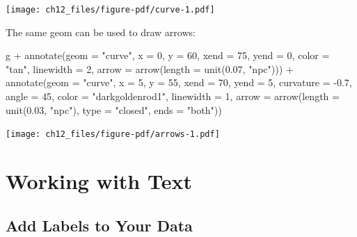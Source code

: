 \documentclass[
  letterpaper,
]{scrbook}
\newenvironment{Shaded}{\begin{snugshade}}{\end{snugshade}}
\newcommand{\AttributeTok}[1]{\textcolor[rgb]{0.40,0.45,0.13}{#1}}
\newcommand{\DecValTok}[1]{\textcolor[rgb]{0.68,0.00,0.00}{#1}}
\newcommand{\FloatTok}[1]{\textcolor[rgb]{0.68,0.00,0.00}{#1}}
\newcommand{\FunctionTok}[1]{\textcolor[rgb]{0.28,0.35,0.67}{#1}}
\newcommand{\NormalTok}[1]{\textcolor[rgb]{0.00,0.23,0.31}{#1}}
\newcommand{\SpecialCharTok}[1]{\textcolor[rgb]{0.37,0.37,0.37}{#1}}
\newcommand{\StringTok}[1]{\textcolor[rgb]{0.13,0.47,0.30}{#1}}
\begin{document}
\texttt{[image: ch12\_files/figure-pdf/curve-1.pdf]}

The same geom can be used to draw arrows:

\begin{Shaded}
\begin{Highlighting}[]
\NormalTok{g }\SpecialCharTok{+}
  \FunctionTok{annotate}\NormalTok{(}\AttributeTok{geom =} \StringTok{"curve"}\NormalTok{, }\AttributeTok{x =} \DecValTok{0}\NormalTok{, }\AttributeTok{y =} \DecValTok{60}\NormalTok{, }\AttributeTok{xend =} \DecValTok{75}\NormalTok{, }\AttributeTok{yend =} \DecValTok{0}\NormalTok{,}
             \AttributeTok{color =} \StringTok{"tan"}\NormalTok{, }\AttributeTok{linewidth =} \DecValTok{2}\NormalTok{, }
             \AttributeTok{arrow =} \FunctionTok{arrow}\NormalTok{(}\AttributeTok{length =} \FunctionTok{unit}\NormalTok{(}\FloatTok{0.07}\NormalTok{, }\StringTok{"npc"}\NormalTok{))) }\SpecialCharTok{+}
  \FunctionTok{annotate}\NormalTok{(}\AttributeTok{geom =} \StringTok{"curve"}\NormalTok{, }\AttributeTok{x =} \DecValTok{5}\NormalTok{, }\AttributeTok{y =} \DecValTok{55}\NormalTok{, }\AttributeTok{xend =} \DecValTok{70}\NormalTok{, }\AttributeTok{yend =} \DecValTok{5}\NormalTok{,}
             \AttributeTok{curvature =} \SpecialCharTok{{-}}\FloatTok{0.7}\NormalTok{, }\AttributeTok{angle =} \DecValTok{45}\NormalTok{,}
             \AttributeTok{color =} \StringTok{"darkgoldenrod1"}\NormalTok{, }\AttributeTok{linewidth =} \DecValTok{1}\NormalTok{,}
             \AttributeTok{arrow =} \FunctionTok{arrow}\NormalTok{(}\AttributeTok{length =} \FunctionTok{unit}\NormalTok{(}\FloatTok{0.03}\NormalTok{, }\StringTok{"npc"}\NormalTok{),}
                           \AttributeTok{type =} \StringTok{"closed"}\NormalTok{,}
                           \AttributeTok{ends =} \StringTok{"both"}\NormalTok{))}
\end{Highlighting}
\end{Shaded}

\texttt{[image: ch12\_files/figure-pdf/arrows-1.pdf]}


\chapter{Working with Text}\label{text}

\section{Add Labels to Your Data}\label{add-labels-to-your-data}
\end{document}

